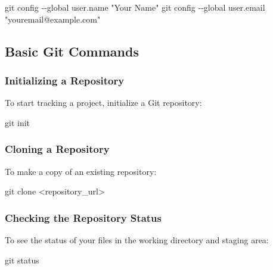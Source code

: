 \documentclass[
  letterpaper,
  DIV=11,
  numbers=noendperiod]{scrreprt}
\newenvironment{Shaded}{\begin{snugshade}}{\end{snugshade}}
\newcommand{\AttributeTok}[1]{\textcolor[rgb]{0.40,0.45,0.13}{#1}}
\newcommand{\FunctionTok}[1]{\textcolor[rgb]{0.28,0.35,0.67}{#1}}
\newcommand{\NormalTok}[1]{\textcolor[rgb]{0.00,0.23,0.31}{#1}}
\newcommand{\OperatorTok}[1]{\textcolor[rgb]{0.37,0.37,0.37}{#1}}
\newcommand{\StringTok}[1]{\textcolor[rgb]{0.13,0.47,0.30}{#1}}
\begin{document}
\begin{Shaded}
\begin{Highlighting}[]
\FunctionTok{git}\NormalTok{ config }\AttributeTok{{-}{-}global}\NormalTok{ user.name }\StringTok{"Your Name"}
\FunctionTok{git}\NormalTok{ config }\AttributeTok{{-}{-}global}\NormalTok{ user.email }\StringTok{"youremail@example.com"}
\end{Highlighting}
\end{Shaded}

\subsection{Basic Git Commands}\label{basic-git-commands}

\subsubsection{Initializing a
Repository}\label{initializing-a-repository}

To start tracking a project, initialize a Git repository:

\begin{Shaded}
\begin{Highlighting}[]
\FunctionTok{git}\NormalTok{ init}
\end{Highlighting}
\end{Shaded}

\subsubsection{Cloning a Repository}\label{cloning-a-repository}

To make a copy of an existing repository:

\begin{Shaded}
\begin{Highlighting}[]
\FunctionTok{git}\NormalTok{ clone }\OperatorTok{\textless{}}\NormalTok{repository\_url}\OperatorTok{\textgreater{}}
\end{Highlighting}
\end{Shaded}

\subsubsection{Checking the Repository
Status}\label{checking-the-repository-status}

To see the status of your files in the working directory and staging
area:

\begin{Shaded}
\begin{Highlighting}[]
\FunctionTok{git}\NormalTok{ status}
\end{Highlighting}
\end{Shaded}
\end{document}
